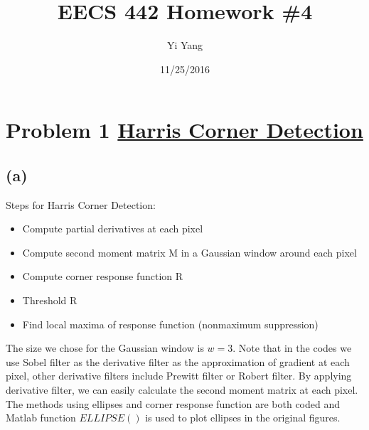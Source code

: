 \documentclass[letterpaper]{article}
\author{Yi Yang}
\title{EECS 442 Homework \#4}
\begin{document}
\date{11/25/2016}
\maketitle

\newcommand{\trace}{\mathrm{trace}}
\newcommand{\real}{\mathbb R}  %
\newcommand{\nat}{\mathbb N}   %
\newcommand{\cp}{\mathbb C}    %
\newcommand{\ds}{\displaystyle}
\newcommand{\mf}[2]{\frac{\ds #1}{\ds #2}}
\newcommand{\spanof}[1]{\textrm{span} \{ #1 \}}
\newcommand{\sol}[0]{\textbf{Solution: }}
\newcommand{\pf}[0]{\textbf{Proof:}}
\newcommand{\rme}[0]{\textrm{e}}
\newcommand{\Null}[1]{\textrm{Null}\{#1\}}
\parindent 0pt
\section*{Problem 1 \underline{Harris Corner Detection}}
\subsection*{(a)}
Steps for Harris Corner Detection:
\begin{itemize}
	\item Compute partial derivatives at each pixel
	\item Compute second moment matrix M in a Gaussian window around each pixel
	\item Compute corner response function R
	\item Threshold R
	\item Find local maxima of response function (nonmaximum suppression)
\end{itemize}
The size we chose for the Gaussian window is $w = 3$. Note that in the codes we use Sobel filter as the derivative filter as the approximation of gradient at each pixel, other derivative filters include Prewitt filter or Robert filter. By applying derivative filter, we can easily calculate the second moment matrix at each pixel. The methods using ellipses and corner response function are both coded and Matlab function $ELLIPSE()$ is used to plot ellipses in the original figures.



\clearpage
\end{document}

